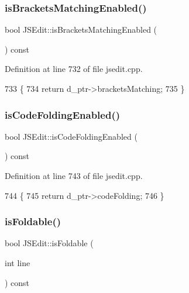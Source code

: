 \subsubsection{\texorpdfstring{is\+Brackets\+Matching\+Enabled()}{isBracketsMatchingEnabled()}}
{\footnotesize\ttfamily bool J\+S\+Edit\+::is\+Brackets\+Matching\+Enabled (\begin{DoxyParamCaption}{ }\end{DoxyParamCaption}) const}



Definition at line 732 of file jsedit.\+cpp.


\begin{DoxyCode}
733 \{
734     \textcolor{keywordflow}{return} d\_ptr->bracketsMatching;
735 \}
\end{DoxyCode}
\mbox{\label{class_j_s_edit_a4ff46404c4277cf3d32b66ee26ff8965}} 
\subsubsection{\texorpdfstring{is\+Code\+Folding\+Enabled()}{isCodeFoldingEnabled()}}
{\footnotesize\ttfamily bool J\+S\+Edit\+::is\+Code\+Folding\+Enabled (\begin{DoxyParamCaption}{ }\end{DoxyParamCaption}) const}



Definition at line 743 of file jsedit.\+cpp.


\begin{DoxyCode}
744 \{
745     \textcolor{keywordflow}{return} d\_ptr->codeFolding;
746 \}
\end{DoxyCode}
\mbox{\label{class_j_s_edit_aa9489a933ccc52750bbcac24d58d284c}} 
\subsubsection{\texorpdfstring{is\+Foldable()}{isFoldable()}}
{\footnotesize\ttfamily bool J\+S\+Edit\+::is\+Foldable (\begin{DoxyParamCaption}\item[{int}]{line }\end{DoxyParamCaption}) const}



